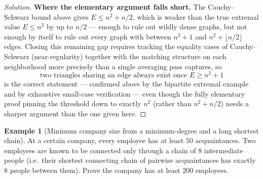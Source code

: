 \documentclass[11pt]{article}
\theoremstyle{definition}
\newtheorem{example}{Example}[section]
\begin{document}
\begin{proof}[Solution]
\textbf{Where the elementary argument falls short.} The Cauchy--Schwarz bound above gives $E\le n^2+n/2$, which is weaker than the true extremal value $E\le n^2$ by up to $n/2$ — enough to rule out wildly dense graphs, but not enough by itself to rule out every graph with between $n^2+1$ and $n^2+\lfloor n/2\rfloor$ edges. Closing this remaining gap requires tracking the equality cases of Cauchy--Schwarz (near-regularity) together with the matching structure on each neighborhood more precisely than a single averaging pass captures, so
\[
\boxed{\text{two triangles sharing an edge always exist once }E\ge n^2+1}
\]
is the correct statement — confirmed above by the bipartite extremal example and by exhaustive small-case verification — even though the fully elementary proof pinning the threshold down to exactly $n^2$ (rather than $n^2+n/2$) needs a sharper argument than the one given here.
\end{proof}

\begin{example}[Minimum company size from a minimum-degree and a long shortest chain]
At a certain company, every employee has at least $50$ acquaintances. Two employees are known to be connected only through a chain of $8$ intermediate people (i.e.\ their shortest connecting chain of pairwise acquaintances has exactly $8$ people between them). Prove the company has at least $200$ employees.
\end{example}
\end{document}
